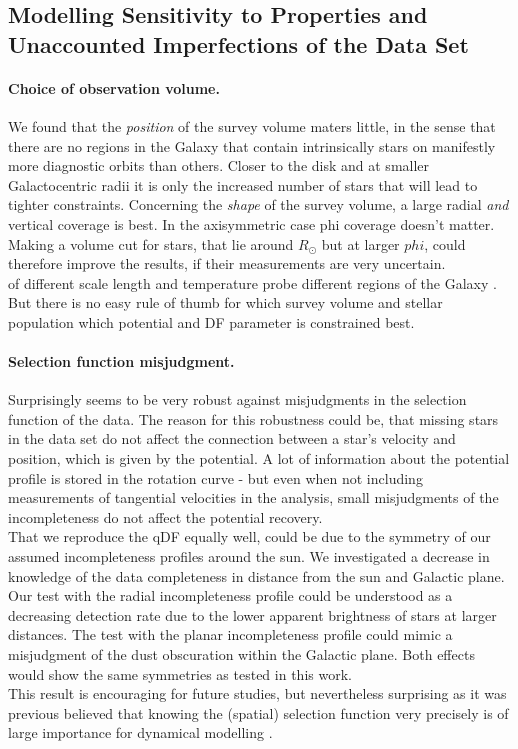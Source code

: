 \subsection{Modelling Sensitivity to Properties and Unaccounted Imperfections of the Data Set}

\paragraph{Choice of observation volume.} We found that the \emph{position} of the survey volume maters little, in the sense that there are no regions in the Galaxy that contain intrinsically stars on manifestly more diagnostic orbits than others. Closer to the disk and at smaller Galactocentric radii it is only the increased number of stars that will lead to tighter constraints. Concerning the \emph{shape} of the survey volume, a large radial \emph{and} vertical coverage is best. In the axisymmetric case phi coverage doesn't matter. Making a volume cut for stars, that lie around $R_\odot$ but at larger $phi$, could therefore improve the results, if their measurements are very uncertain.
\\\MAPs{} of different scale length and temperature probe different regions of the Galaxy \citep{bov13}. But there is no easy rule of thumb for which survey volume and stellar population which potential and DF parameter is constrained best.

\paragraph{Selection function misjudgment.} Surprisingly \RM{} seems to be very robust against misjudgments in the selection function of the data. The reason for this robustness could be, that missing stars in the data set do not affect the connection between a star's velocity and position, which is given by the potential. A lot of information about the potential profile is stored in the rotation curve - but even when not including measurements of tangential velocities in the analysis, small misjudgments of the incompleteness do not affect the potential recovery.
\\That we reproduce the qDF equally well, could be due to the symmetry of our assumed incompleteness profiles around the sun. We investigated a decrease in knowledge of the data completeness in distance from the sun and Galactic plane. Our test with the radial incompleteness profile could be understood as a decreasing detection rate due to the lower apparent brightness of stars at larger distances. The test with the planar incompleteness profile could mimic a misjudgment of the dust obscuration within the Galactic plane. Both effects would show the same symmetries as tested in this work. 
\\This result is encouraging for future studies, but nevertheless surprising as it was previous believed that knowing the (spatial) selection function very precisely is of large importance for dynamical modelling \citep{rix13}.

